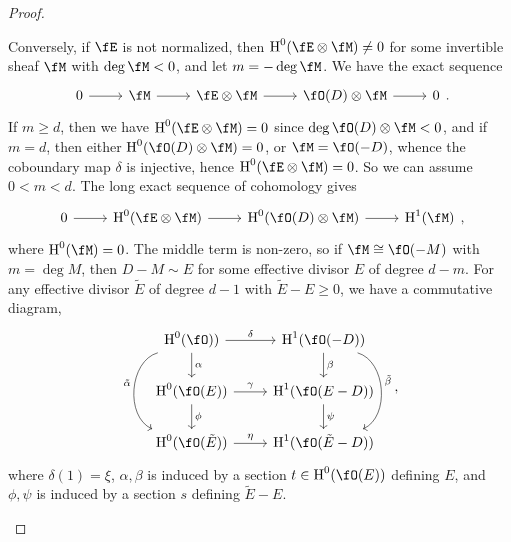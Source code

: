 \documentclass[a4paper]{article}
\begin{document}
\begin{enumerate} [label=\textbf{\arabic*.}, leftmargin=0em]
\begin{proof}
\begin{itemize} [leftmargin=0cm]
                        Conversely, if $\fE$ is not normalized, then $\cH^0(\fE \otimes \fM) \neq 0$ for some invertible sheaf $\fM$ with $\deg{\fM} < 0$, and let $m = -\deg{\fM}$.
                        We have the exact sequence
                        \[ \begin{tikzcd}
                                0 \arrow[r] & \fM \arrow[r] & \fE \otimes \fM \arrow[r] & \fO(D) \otimes \fM \arrow[r] & 0
                            \end{tikzcd}. \]
                        If $m \geq d$, then we have $\cH^0(\fE \otimes \fM) = 0$ since $\deg{\fO(D) \otimes \fM} < 0$, and if $m = d$, then either $\cH^0(\fO(D) \otimes \fM) = 0$, or $\fM = \fO(-D)$, whence the coboundary map $\delta$ is injective, hence $\cH^0(\fE \otimes \fM) = 0$.
                        So we can assume $0 < m < d$.
                        The long exact sequence of cohomology gives
                        \[ \begin{tikzcd}
                                0 \arrow[r] & \cH^0(\fE \otimes \fM) \arrow[r] & \cH^0(\fO(D) \otimes \fM) \arrow[r] & \cH^1(\fM)
                            \end{tikzcd}, \]
                        where $\cH^0(\fM) = 0$.
                        The middle term is non-zero, so if $\fM \cong \fO(-M)$ with $m = \deg{M}$, then $D - M \sim E$ for some effective divisor $E$ of degree $d - m$.
                        For any effective divisor $\tilde{E}$ of degree $d - 1$ with $\tilde{E} - E \geq 0$, we have a commutative diagram,
                        \[ \begin{tikzcd}
                                \cH^0(\fO)) \arrow[r, "\delta"] \arrow[d, "\alpha"] \arrow[dd, "\tilde{\alpha}"', bend right=70] & \cH^1(\fO(-D)) \arrow[d, "\beta"] \arrow[dd, "\tilde{\beta}", bend left=70] \\
                                \cH^0(\fO(E)) \arrow[r, "\gamma"] \arrow[d, "\phi"]                                              & \cH^1(\fO(E - D)) \arrow[d, "\psi"]                                            \\
                                \cH^0(\fO(\tilde{E})) \arrow[r, "\eta"]                                                          & \cH^1(\fO(\tilde{E} - D))
                            \end{tikzcd}, \]
                        where $\delta(1) = \xi$, $\alpha, \beta$ is induced by a section $t \in \cH^0(\fO(E))$ defining $E$, and $\phi, \psi$ is induced by a section $s$ defining $\tilde{E} - E$.


\end{itemize}
\end{proof}
\end{enumerate}
\end{document}
